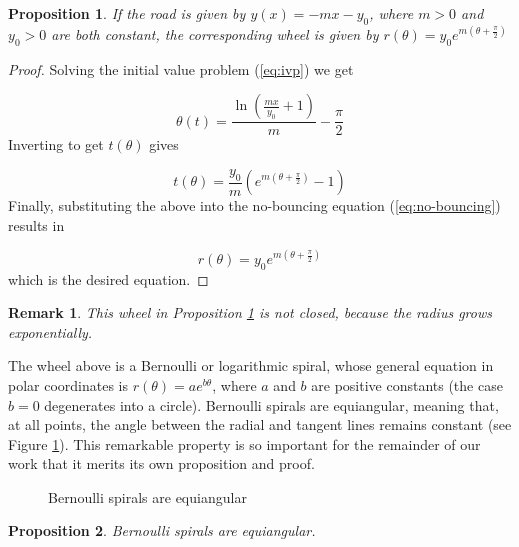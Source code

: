 \documentclass{article}
\theoremstyle{theorem}
\newtheorem{prop}{Proposition}[section]
\theoremstyle{theorem}
\newtheorem{remark}{Remark}[section]
\begin{document}
\begin{prop}
  \label{spiral-wheel}
  If the road is given by $y(x)=-mx-y_0$, where $m>0$ and $y_0>0$ are
  both constant, the corresponding wheel is given by
  $r(\theta)=y_0e^{m(\theta+\frac{\pi}{2})}$
\end{prop}

\begin{proof}
  Solving the initial value problem (\ref{eq:ivp}) we get

  \begin{equation}
    \theta(t)=\frac{\ln\left(\frac{mx}{y_0}+1\right)}{m}-\frac{\pi}{2}
  \end{equation}
  Inverting to get $t(\theta)$ gives

\begin{equation}
  t(\theta) = \frac{y_0}{m}\left(e^{m\left(\theta+\frac{\pi}{2}\right)}-1\right)
\end{equation}
Finally, substituting the above into the no-bouncing equation
(\ref{eq:no-bouncing}) results in

\begin{equation}
  r(\theta)=y_0e^{m\left(\theta+\frac{\pi}{2}\right)}
\end{equation}
which is the desired equation.
\end{proof}

\begin{remark}
  This wheel in Proposition \ref{spiral-wheel} is not closed, because
  the radius grows exponentially.
\end{remark}

The wheel above is a Bernoulli or logarithmic spiral, whose general
equation in polar coordinates is $r(\theta)=ae^{b\theta}$, where $a$
and $b$ are positive constants (the case $b=0$ degenerates into a
circle). Bernoulli spirals are equiangular, meaning that, at all
points, the angle between the radial and tangent lines remains
constant (see Figure \ref{fig:spiral}). This remarkable property is so
important for the remainder of our work that it merits its own
proposition and proof.

\begin{figure}
  \centering 
  \caption{Bernoulli spirals are equiangular}
  \label{fig:spiral}
\end{figure}


\begin{prop}
  \label{prop:equiangular}
  Bernoulli spirals are equiangular.
\end{prop}
\end{document}
